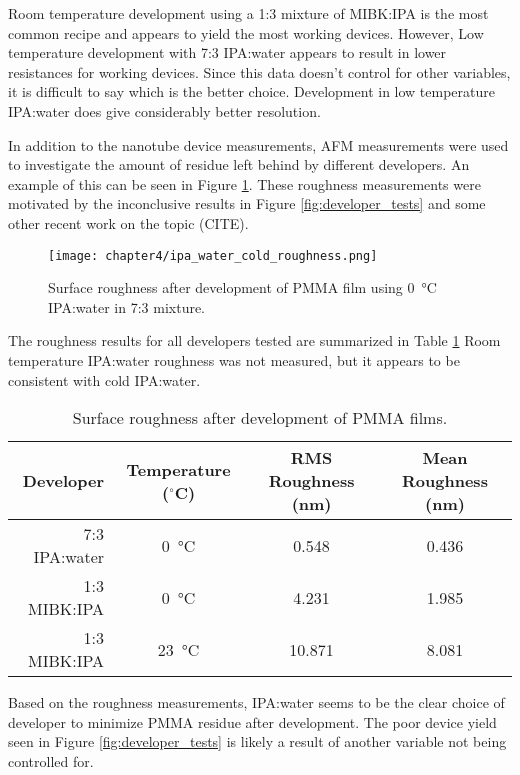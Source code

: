 Room temperature development using a 1:3 mixture of MIBK:IPA is the most common recipe and appears to yield the most working devices. However, Low temperature development with 7:3 IPA:water appears to result in lower resistances for working devices. Since this data doesn't control for other variables, it is difficult to say which is the better choice. Development in low temperature IPA:water does give considerably better resolution. 

In addition to the nanotube device measurements, AFM measurements were used to investigate the amount of residue left behind by different developers. An example of this can be seen in Figure \ref{fig:roughness}. These roughness measurements were motivated by the inconclusive results in Figure \ref{fig:developer_tests} and some other recent work on the topic (CITE).

\begin{figure}
    \centering
    \texttt{[image: chapter4/ipa\_water\_cold\_roughness.png]}
    \caption{Surface roughness after development of PMMA film using \SI{0}{\celsius} IPA:water in 7:3 mixture.}
    \label{fig:roughness}
\end{figure}

The roughness results for all developers tested are summarized in Table \ref{table:surface_roughness} Room temperature IPA:water roughness was not measured, but it appears to be consistent with cold IPA:water. 

\begin{table}
    \centering
    \caption{Surface roughness after development of PMMA films.}
    \begin{tabular}{ r | c c c}
        Developer & Temperature ($^{\circ}$C) & RMS Roughness (nm) & Mean Roughness (nm) \\ \hline
    7:3 IPA:water & \SI{0}{\celsius} & 0.548 & 0.436 \\
    1:3 MIBK:IPA & \SI{0}{\celsius} & 4.231 & 1.985 \\
    1:3 MIBK:IPA & \SI{23}{\celsius} & 10.871 & 8.081 \\
    \end{tabular}
    \label{table:surface_roughness}  
\end{table}

Based on the roughness measurements, IPA:water seems to be the clear choice of developer to minimize PMMA residue after development. The poor device yield seen in Figure \ref{fig:developer_tests} is likely a result of another variable not being controlled for.

